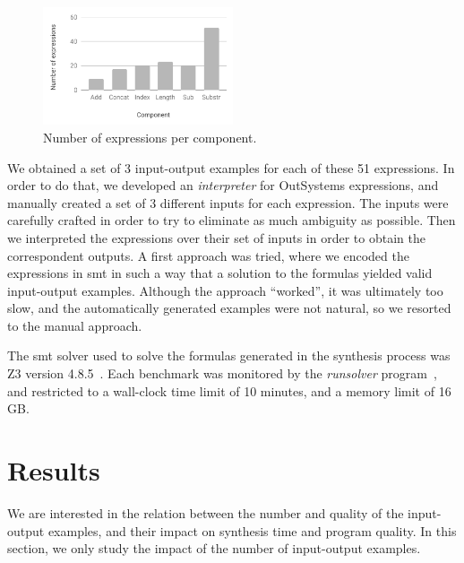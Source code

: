 \begin{figure}
  \centering
  \includegraphics[width=0.5\textwidth]{assets/bar-chart-components-freq-51.pdf}
  \caption{Number of expressions per component.}
  \label{fig:bar-chart-components-freq-51}
\end{figure}

We obtained a set of 3 input-output examples for each of these 51 expressions.
In order to do that, we developed an \textit{interpreter} for OutSystems
expressions, and manually created a set of 3 different inputs for each
expression.
The inputs were carefully crafted in order to try to eliminate as much ambiguity
as possible.
Then we interpreted the expressions over their set of inputs in order to
obtain the correspondent outputs.
A first approach was tried, where we encoded the expressions in \gls{smt} in
such a way that a solution to the formulas yielded valid input-output examples.
Although the approach ``worked'', it was ultimately too slow, and the
automatically generated examples were not natural, so we resorted to the manual
approach.

The \gls{smt} solver used to solve the formulas generated in the synthesis
process was Z3 version 4.8.5~\cite{DeMoura:2008:ZES}.
Each benchmark was monitored by the \textit{runsolver}
program~\cite{Roussel:2011:JSAT}, and restricted to a wall-clock time limit of
10 minutes, and a memory limit of 16 GB.

\section{Results}
\label{sec:results}

We are interested in the relation between the number and quality of the
input-output examples, and their impact on synthesis time and program quality.
In this section, we only study the impact of the number of input-output
examples.

